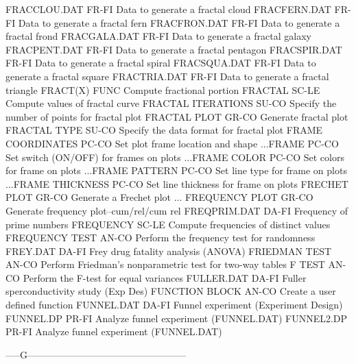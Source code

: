 FRACCLOU.DAT                FR-FI Data to generate a fractal cloud
FRACFERN.DAT                FR-FI Data to generate a fractal fern
FRACFRON.DAT                FR-FI Data to generate a fractal frond
FRACGALA.DAT                FR-FI Data to generate a fractal galaxy
FRACPENT.DAT                FR-FI Data to generate a fractal pentagon
FRACSPIR.DAT                FR-FI Data to generate a fractal spiral
FRACSQUA.DAT                FR-FI Data to generate a fractal square
FRACTRIA.DAT                FR-FI Data to generate a fractal triangle
FRACT(X)                    FUNC  Compute fractional portion
FRACTAL                     SC-LE Compute values of fractal curve
FRACTAL ITERATIONS          SU-CO Specify the number of points for fractal plot
FRACTAL PLOT                GR-CO Generate fractal plot
FRACTAL TYPE                SU-CO Specify the data format for fractal plot
FRAME COORDINATES           PC-CO Set plot frame location and shape
...FRAME                    PC-CO Set switch (ON/OFF) for frames on plots
...FRAME COLOR              PC-CO Set colors for frame on plots
...FRAME PATTERN            PC-CO Set line type for frame on plots
...FRAME THICKNESS          PC-CO Set line thickness for frame on plots
FRECHET PLOT                GR-CO Generate a Frechet plot
... FREQUENCY PLOT          GR-CO Generate frequency plot--cum/rel/cum rel
FREQPRIM.DAT                DA-FI Frequency of prime numbers
FREQUENCY                   SC-LE Compute frequencies of distinct values
FREQUENCY TEST              AN-CO Perform the frequency test for randomness
FREY.DAT                    DA-FI Frey drug fatality analysis (ANOVA)
FRIEDMAN TEST               AN-CO Perform Friedman's nonparametric test for two-way tables
F TEST                      AN-CO Perform the F-test for equal variances
FULLER.DAT                  DA-FI Fuller sperconductivity study (Exp Des)
FUNCTION BLOCK              AN-CO Create a user defined function
FUNNEL.DAT                  DA-FI Funnel experiment (Experiment Design)
FUNNEL.DP                   PR-FI Analyze funnel experiment (FUNNEL.DAT)
FUNNEL2.DP                  PR-FI Analyze funnel experiment (FUNNEL.DAT)

-----G--------------------------------------------------


